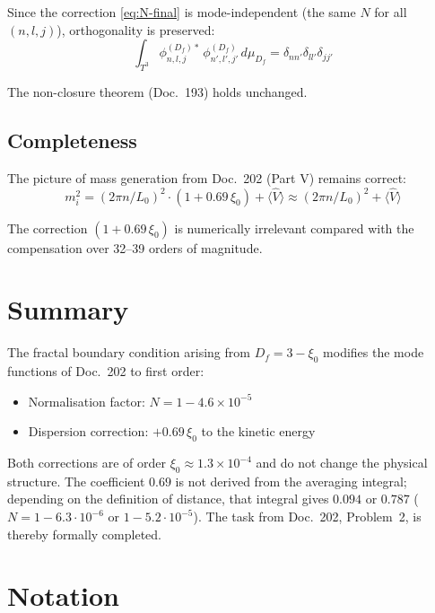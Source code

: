 Since the correction \eqref{eq:N-final} is mode-independent
(the same $N$ for all $(n,l,j)$), orthogonality is preserved:
\begin{equation}
  \int_{T^3}
  \phi_{n,l,j}^{(D_f)*}\,\phi_{n',l',j'}^{(D_f)}\,d\mu_{D_f}
  = \delta_{nn'}\delta_{ll'}\delta_{jj'}
\end{equation}

The non-closure theorem (Doc.~193) holds unchanged.

\subsection{Completeness}

The picture of mass generation from Doc.~202 (Part V) remains correct:
\[
  m_i^2 = (2\pi n/L_0)^2\cdot(1+0.69\,\xi_0) + \langle\hat{V}\rangle
  \approx (2\pi n/L_0)^2 + \langle\hat{V}\rangle
\]

The correction $(1+0.69\,\xi_0)$ is numerically irrelevant compared
with the compensation over 32--39 orders of magnitude.

\section*{Summary}

The fractal boundary condition arising from $D_f = 3-\xi_0$ modifies the
mode functions of Doc.~202 to first order:
\begin{itemize}
  \item Normalisation factor: $N = 1 - 4.6\times10^{-5}$
  \item Dispersion correction: $+0.69\,\xi_0$ to the kinetic energy
\end{itemize}
Both corrections are of order $\xi_0 \approx 1.3\times10^{-4}$
and do not change the physical structure. The coefficient $0.69$ is
not derived from the averaging integral; depending on the definition
of distance, that integral gives $0.094$ or $0.787$
($N = 1 - 6.3 \cdot 10^{-6}$ or $1 - 5.2 \cdot 10^{-5}$).
The task from Doc.~202,
Problem~2, is thereby formally completed.


\section*{Notation}

